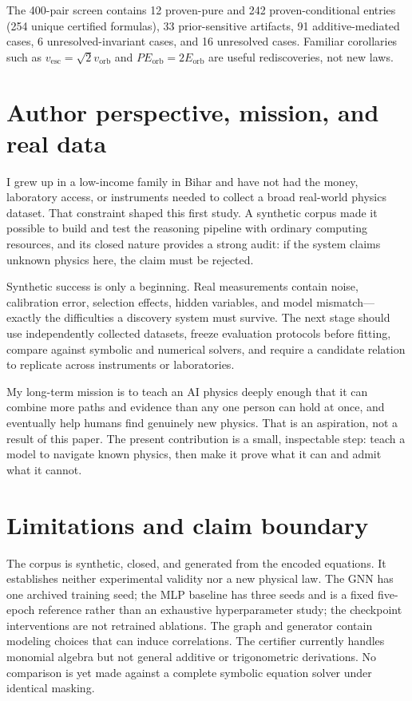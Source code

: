 \documentclass[10pt]{article}
\begin{document}
The 400-pair screen contains 12 proven-pure and 242 proven-conditional entries (254 unique certified formulas), 33 prior-sensitive artifacts, 91 additive-mediated cases, 6 unresolved-invariant cases, and 16 unresolved cases. Familiar corollaries such as $v_{\mathrm{esc}}=\sqrt{2}v_{\mathrm{orb}}$ and $PE_{\mathrm{orb}}=2E_{\mathrm{orb}}$ are useful rediscoveries, not new laws.

\section{Author perspective, mission, and real data}

I grew up in a low-income family in Bihar and have not had the money, laboratory access, or instruments needed to collect a broad real-world physics dataset. That constraint shaped this first study. A synthetic corpus made it possible to build and test the reasoning pipeline with ordinary computing resources, and its closed nature provides a strong audit: if the system claims unknown physics here, the claim must be rejected.

Synthetic success is only a beginning. Real measurements contain noise, calibration error, selection effects, hidden variables, and model mismatch---exactly the difficulties a discovery system must survive. The next stage should use independently collected datasets, freeze evaluation protocols before fitting, compare against symbolic and numerical solvers, and require a candidate relation to replicate across instruments or laboratories.

My long-term mission is to teach an AI physics deeply enough that it can combine more paths and evidence than any one person can hold at once, and eventually help humans find genuinely new physics. That is an aspiration, not a result of this paper. The present contribution is a small, inspectable step: teach a model to navigate known physics, then make it prove what it can and admit what it cannot.

\section{Limitations and claim boundary}

The corpus is synthetic, closed, and generated from the encoded equations. It establishes neither experimental validity nor a new physical law. The GNN has one archived training seed; the MLP baseline has three seeds and is a fixed five-epoch reference rather than an exhaustive hyperparameter study; the checkpoint interventions are not retrained ablations. The graph and generator contain modeling choices that can induce correlations. The certifier currently handles monomial algebra but not general additive or trigonometric derivations. No comparison is yet made against a complete symbolic equation solver under identical masking.
\end{document}
